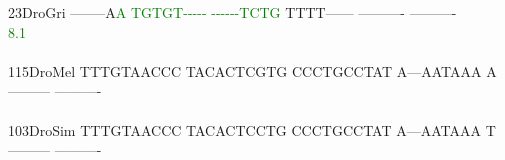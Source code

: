 \documentclass[11pt,twoside,reqno,a4paper]{article}
\begin{document}
{23\hspace*{3\charwidth}DroGri	--------A\textcolor{Green}{A}	\textcolor{Green}{T}\textcolor{Green}{G}\textcolor{Green}{T}\textcolor{Green}{G}\textcolor{Green}{T}\textcolor{Green}{-}\textcolor{Green}{-}\textcolor{Green}{-}\textcolor{Green}{-}\textcolor{Green}{-}	\textcolor{Green}{-}\textcolor{Green}{-}\textcolor{Green}{-}\textcolor{Green}{-}\textcolor{Green}{-}\textcolor{Green}{-}\textcolor{Green}{T}\textcolor{Green}{C}\textcolor{Green}{T}\textcolor{Green}{G}	TTTT------	----------	----------	\\
\hspace*{5\charwidth}\hspace*{7\charwidth}\hspace*{9\charwidth}\textcolor{Green}{8.1}\hspace*{1\charwidth}\hspace*{1\charwidth}\hspace*{1\charwidth}\hspace*{1\charwidth}\hspace*{1\charwidth}\hspace*{1\charwidth}\\
\\
115\hspace*{2\charwidth}DroMel	TTTGTAACCC	TACACTCGTG	CCCTGCCTAT	A---AATAAA	A---------	----------	\\
\hspace*{5\charwidth}\hspace*{7\charwidth}\hspace*{1\charwidth}\hspace*{1\charwidth}\hspace*{1\charwidth}\hspace*{1\charwidth}\hspace*{1\charwidth}\hspace*{1\charwidth}\\
103\hspace*{2\charwidth}DroSim	TTTGTAACCC	TACACTCCTG	CCCTGCCTAT	A---AATAAA	T---------	----------	\\
\hspace*{5\charwidth}\hspace*{7\charwidth}\hspace*{1\charwidth}\hspace*{1\charwidth}\hspace*{1\charwidth}\hspace*{1\charwidth}\hspace*{1\charwidth}\hspace*{1\charwidth}\\
}
\end{document}
